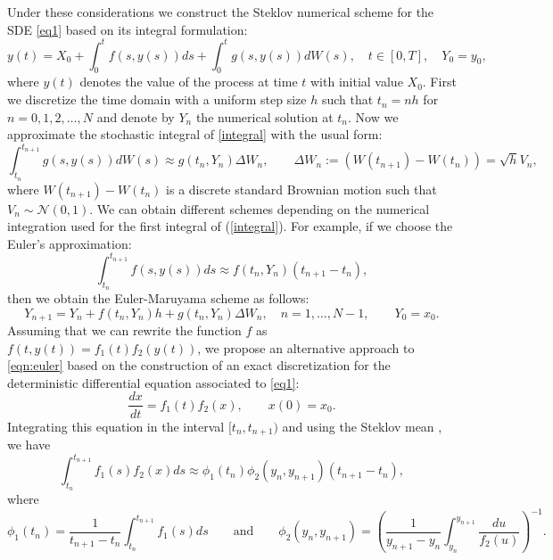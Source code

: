 
	Under these considerations we construct the Steklov numerical scheme for the SDE
	\eqref{eq1} based on its  integral formulation:
	\begin{equation}\label{integral} 
		y(t)= X_0+\int_0^t 
		f(s,y(s)) ds+ \int_0^t 
		g(s,y(s)) dW(s),   \quad t\in[0,T], \quad Y_0=y_0,
	\end{equation} 
	where $y(t)$  denotes the value of the process at time $t$ with initial value  $X_0$.
	First we discretize the time domain with a uniform  step size $h$ such that $t_n=nh$
	for $n=0,1,2,\dots,N$ and denote by $Y_n$  the numerical solution at $t_n$. Now we
	approximate the stochastic integral of \eqref{integral} with the usual form:
	\begin{equation}\label{discret} 
		\int_{t_n}^{t_{n+1}} g(s,y(s)) dW(s)\approx g(t_n,Y_n)\Delta W_n, \qquad
		\Delta W_n:=(W(t_{n+1})-W(t_n))=\sqrt{h} V_n,
	\end{equation} 
	where $W(t_{n+1})-W(t_n)$ is a discrete standard Brownian motion such that $V_n\sim
	\mathcal{N}(0,1)$. We can obtain different schemes depending on the numerical
	integration used for the first integral of (\ref{integral}). For example, if we choose
	the Euler's approximation:  
	\begin{equation}\label{eqn:euler} 
		\int_{t_n}^{t_{n+1}} f(s, y(s))ds\approx 
		f(t_n,Y_n)(t_{n+1}-t_n), 
	\end{equation} 
		then we obtain the Euler-Maruyama scheme as follows:
	\begin{equation}\label{EM} 
		Y_{n+1}=Y_n + f(t_n,Y_n)h + g(t_n,Y_n)\Delta W_n, 
		\quad n=1,\dots,N-1, \qquad Y_0=x_0. 
	\end{equation} 
	Assuming that we can rewrite the function $f$ as $f(t,y(t))=f_1(t)f_2(y(t))$, we
	propose  an alternative approach to \eqref{eqn:euler} based on the construction of an
	exact  discretization for the deterministic  differential equation associated to
	\eqref{eq1}:
	\begin{equation}\label{eqn:DeterODE}
		\frac{dx}{dt}=f_1(t)f_2(x), \qquad x(0)=x_0.
	\end{equation}
	Integrating this equation in the interval $[t_n,t_{n+1})$ and 
	using the Steklov mean  \cite{Matus2005}, we have
	\begin{equation}\label{stek1}
		\int_{t_n}^{t_{n+1}} f_1(s)f_2(x)ds \approx
		\phi_1(t_n)\phi_2(y_n,y_{n+1})(t_{n+1}-t_n),
	\end{equation}
		where
		\begin{equation*}
			\phi_1(t_n)=\frac{1}{t_{n+1}-t_n}\int_{t_n}^{t_{n+1}} f_1(s)ds\qquad 
			\mbox{and} \qquad
			\phi_2(y_n,y_{n+1})=\left(\frac{1}{y_{n+1}-y_{n}} 
			\int_{y_n}^{y_{n+1}} 
			\frac{du}{f_2(u)} 
			\right)^{-1}. 
	\end{equation*}

